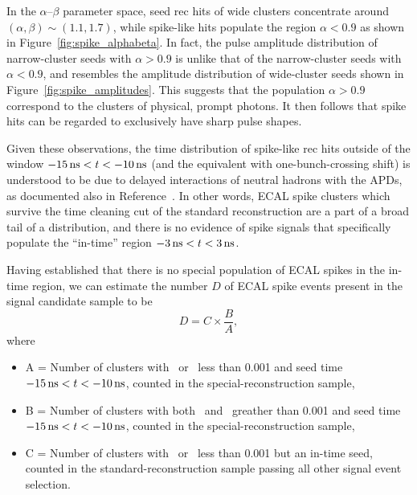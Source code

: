 In the $\alpha$--$\beta$ parameter space, seed rec hits of wide clusters concentrate around $(\alpha, \beta) \sim (1.1, 1.7)$, while spike-like hits populate the region $\alpha < 0.9$ as shown in Figure~\ref{fig:spike_alphabeta}.
In fact, the pulse amplitude distribution of narrow-cluster seeds with $\alpha > 0.9$ is unlike that of the narrow-cluster seeds with $\alpha < 0.9$, and resembles the amplitude distribution of wide-cluster seeds shown in Figure~\ref{fig:spike_amplitudes}.
This suggests that the population $\alpha > 0.9$ correspond to the clusters of physical, prompt photons.
It then follows that spike hits can be regarded to exclusively have
sharp pulse shapes. 

Given these observations, the time distribution of spike-like rec hits outside of the window $-15\, \text{ns} < t < -10\, \text{ns}$ (and the equivalent with one-bunch-crossing shift) is understood to be due to delayed interactions of neutral hadrons with the APDs, as documented also in Reference~\cite{CMS_AN_2010-357}. 
In other words, ECAL spike clusters which survive the time cleaning cut of the standard reconstruction are a part of a broad tail of a distribution, and there is no evidence of spike signals that specifically populate the ``in-time'' region $-3\, \text{ns} < t < 3\, \text{ns}$.

Having established that there is no special population of ECAL spikes in the in-time region, we can estimate the number $D$ of ECAL spike events present in the signal candidate sample to be
\begin{equation}
  D = C \times \frac{B}{A},
\end{equation}
where
\begin{itemize}
  \item A = Number of clusters with \sieie\ or \sipip\ less than 0.001 and seed time $-15\, \text{ns} < t < -10\, \text{ns}$, counted in the special-reconstruction sample,
  \item B = Number of clusters with both \sieie\ and \sipip\ greather than 0.001 and seed time $-15\, \text{ns} < t < -10\, \text{ns}$, counted in the special-reconstruction sample, 
  \item C = Number of clusters with \sieie\ or \sipip\ less than 0.001 but an in-time seed, counted in the standard-reconstruction sample passing all other signal event selection.
\end{itemize}


